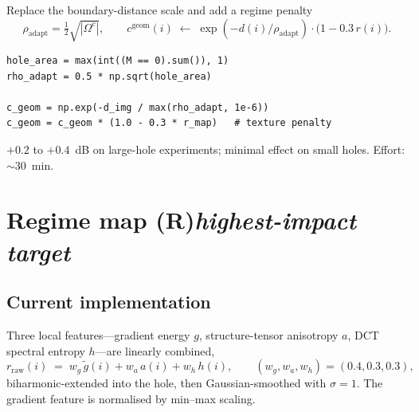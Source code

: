 \documentclass[11pt,a4paper]{article}
\begin{document}
\begin{fixbox}
Replace the boundary-distance scale and add a regime penalty
\begin{equation}
    \rho_{\mathrm{adapt}} = \tfrac{1}{2}\sqrt{|\Omega^{c}|},
    \qquad
    c^{\mathrm{geom}}(i) \;\leftarrow\;
    \exp\!\left(-d(i)/\rho_{\mathrm{adapt}}\right)\cdot\bigl(1 - 0.3\,r(i)\bigr).
\end{equation}
\end{fixbox}

\begin{lstlisting}[caption={Hole-size-adaptive $\rho$ and regime-modulated geometric term.}]
hole_area = max(int((M == 0).sum()), 1)
rho_adapt = 0.5 * np.sqrt(hole_area)

c_geom = np.exp(-d_img / max(rho_adapt, 1e-6))
c_geom = c_geom * (1.0 - 0.3 * r_map)   # texture penalty
\end{lstlisting}

\begin{impactbox}
$+0.2$ to $+0.4$~dB on large-hole experiments; minimal effect on small
holes. Effort: $\sim$30~min.
\end{impactbox}

\section{Regime map (R)\quad\textmd{\textit{highest-impact target}}}\label{sec:R}

\subsection*{Current implementation}

Three local features---gradient energy $g$, structure-tensor anisotropy
$a$, DCT spectral entropy $h$---are linearly combined,
\begin{equation}
    r_{\mathrm{raw}}(i) \;=\; w_g\,\tilde g(i) + w_a\,a(i) + w_h\,h(i),
    \qquad (w_g, w_a, w_h) = (0.4, 0.3, 0.3),
\end{equation}
biharmonic-extended into the hole, then Gaussian-smoothed with $\sigma=1$.
The gradient feature is normalised by min--max scaling.
\end{document}
